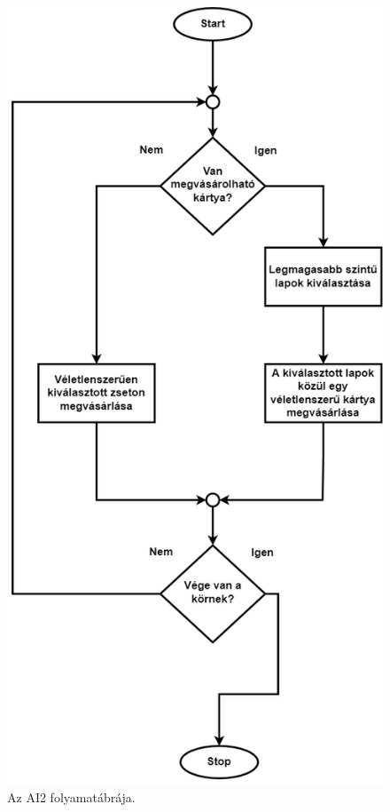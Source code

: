 \begin{figure}[h]
\centering
\includegraphics[scale=0.5]{images/secondAI_flowchart.png}
\caption{Az AI2 folyamatábrája.}
\label{fig:AI2_flowchart}
\end{figure}

